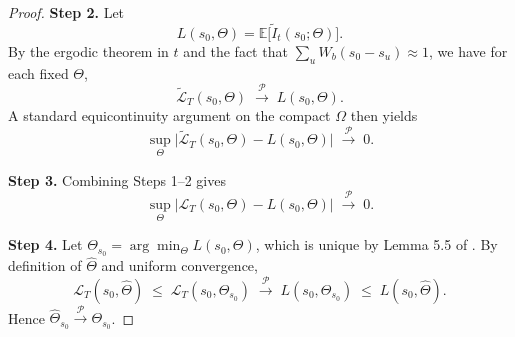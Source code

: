 \documentclass[fleqn,11pt]{article}
\begin{document}
\begin{proof}
\medskip\noindent\textbf{Step 2.}  
Let
$$
L(s_{0},\Theta)
=\mathbb{E}\bigl[\widetilde{I}_{t}(s_{0};\Theta)\bigr].
$$
By the ergodic theorem in \(t\) and the fact that \(\sum_{u}W_{b}(s_{0}-s_{u}) \approx 1\), we have for each fixed \(\Theta\),
$$
\widetilde{\mathcal{L}}_{T}(s_{0},\Theta)
\;\xrightarrow{\mathcal{P}}\;
L(s_{0},\Theta).
$$
A standard equicontinuity argument on the compact \(\Omega\) then yields
$$
\sup_{\Theta}
\bigl|\widetilde{\mathcal{L}}_{T}(s_{0},\Theta)
- L(s_{0},\Theta)\bigr|
\;\xrightarrow{\mathcal{P}}\;
0.
$$

\medskip\noindent\textbf{Step 3.}  
Combining Steps 1–2 gives
$$
\sup_{\Theta}
\bigl|\mathcal{L}_{T}(s_{0},\Theta)
- L(s_{0},\Theta)\bigr|
\;\xrightarrow{\mathcal{P}}\;
0.
$$

\medskip\noindent\textbf{Step 4.}  
Let \(\Theta_{s_{0}}=\arg\min_{\Theta}L(s_{0},\Theta)\), which is unique by Lemma 5.5 of \cite{Horv}.  
By definition of \(\hat{\Theta}\) and uniform convergence,
$$
\mathcal{L}_{T}(s_{0},\hat{\Theta})
\;\le\;
\mathcal{L}_{T}(s_{0},\Theta_{s_{0}})
\;\xrightarrow{\mathcal{P}}\;
L(s_{0},\Theta_{s_{0}})
\;\le\;
L(s_{0},\hat{\Theta}).
$$
Hence \(\hat{\Theta}_{s_0}\xrightarrow{\mathcal{P}}\Theta_{s_0}\).

\end{proof}
\end{document}
